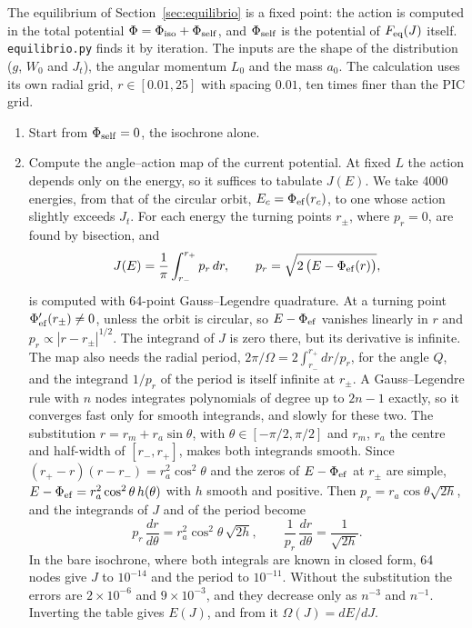 \documentclass[11pt,a4paper]{article}
\begin{document}
The equilibrium of Section~\ref{sec:equilibrio} is a fixed point: the action is computed
in the total potential $\Phi=\Phi_{\rm iso}+\Phi_{\rm self}$, and $\Phi_{\rm self}$ is the
potential of $F_{\rm eq}(J)$ itself. \texttt{equilibrio.py} finds it by iteration. The inputs are the shape of the distribution ($g$, $W_0$ and
$J_t$), the angular momentum $L_0$ and the mass $a_0$. The calculation uses its own
radial grid, $r\in[0.01,25]$ with spacing $0.01$, ten times finer than the PIC grid.
\begin{enumerate}
\item Start from $\Phi_{\rm self}=0$, the isochrone alone.
\item Compute the angle--action map of the current potential. At fixed $L$ the action
depends only on the energy, so it suffices to tabulate $J(E)$. We take 4000 energies,
from that of the circular orbit, $E_c=\Phi_{\rm ef}(r_c)$, to one whose action slightly
exceeds $J_t$. For each energy the turning points $r_\pm$, where $p_r=0$, are found by
bisection, and
\[
  J(E)=\frac1\pi\int_{r_-}^{r_+}p_r\,dr,\qquad p_r=\sqrt{2\,\big(E-\Phi_{\rm ef}(r)\big)},
\]
is computed with 64-point Gauss--Legendre quadrature. At a turning point
$\Phi_{\rm ef}'(r_\pm)\ne0$, unless the orbit is circular, so $E-\Phi_{\rm ef}$ vanishes linearly
in $r$ and $p_r\propto|r-r_\pm|^{1/2}$. The integrand of $J$ is zero there, but its derivative
is infinite. The map also needs the radial period, $2\pi/\Omega=2\int_{r_-}^{r_+}dr/p_r$, for the
angle $Q$, and the integrand $1/p_r$ of the period is itself infinite at $r_\pm$. A Gauss--Legendre
rule with $n$ nodes integrates polynomials of degree up to $2n-1$ exactly, so it converges
fast only for smooth integrands, and slowly for these two. The substitution
$r=r_m+r_a\sin\theta$, with $\theta\in[-\pi/2,\pi/2]$ and $r_m$, $r_a$ the centre and half-width
of $[r_-,r_+]$, makes both integrands smooth. Since $(r_+-r)(r-r_-)=r_a^2\cos^2\theta$ and the
zeros of $E-\Phi_{\rm ef}$ at $r_\pm$ are simple, $E-\Phi_{\rm ef}=r_a^2\cos^2\theta\,h(\theta)$ with
$h$ smooth and positive. Then $p_r=r_a\cos\theta\sqrt{2h}$, and the integrands of $J$ and of
the period become
\[
  p_r\,\frac{dr}{d\theta}=r_a^2\cos^2\theta\,\sqrt{2h},\qquad
  \frac1{p_r}\,\frac{dr}{d\theta}=\frac1{\sqrt{2h}}.
\]
In the bare isochrone, where both integrals are known in closed form, 64 nodes give $J$ to
$10^{-14}$ and the period to $10^{-11}$. Without the substitution the errors are
$2\times10^{-6}$ and $9\times10^{-3}$, and they decrease only as $n^{-3}$ and $n^{-1}$. Inverting
the table gives $E(J)$, and from it $\Omega(J)=dE/dJ$.

\end{enumerate}
\end{document}
